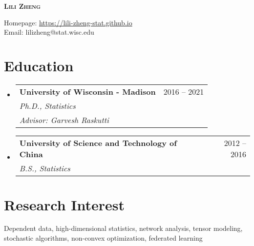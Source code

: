 \documentclass[letterpaper,11pt]{article}
\makeatletter
\newcommand{\resumeSubheadingthreelines}[6]{
	\vspace{-2pt}\item
	\begin{tabular*}{0.97\textwidth}[t]{l@{\extracolsep{\fill}}r}
		\textbf{#1} & #2 \\
		\textit{\small#3} & \textit{\small #4} \\
		\textit{\small#5} & \textit{\small #6} 
	\end{tabular*}\vspace{-7pt}
}
\newcommand{\resumeSubheading}[4]{
	\vspace{-2pt}\item
	\begin{tabular*}{0.97\textwidth}[t]{l@{\extracolsep{\fill}}r}
		\textbf{#1} & #2 \\
		\textit{\small#3} & \textit{\small #4}
	\end{tabular*}\vspace{-7pt}
}
\newcommand{\resumeSubHeadingListStart}{\begin{itemize}[leftmargin=0.15in, label={}]}
\newcommand{\resumeSubHeadingListEnd}{\end{itemize}}
\makeatother
\begin{document}
	
	
	\begin{center}
		\textbf{\Huge \scshape Lili Zheng} \\ \vspace{1pt}
		\begin{center}{\small Homepage: \href{https://Lili-Zheng-stat.github.io}{https://lili-zheng-stat.github.io}\\Email: lilizheng@stat.wisc.edu}
	\end{center}
	\end{center}
	
	
	\section{Education}
	\resumeSubHeadingListStart
	\resumeSubheadingthreelines
	{University of Wisconsin - Madison}{2016 -- 2021}
	{{\sl Ph.D.}, Statistics}{}
	{Advisor: Garvesh Raskutti}{}
	\resumeSubheading
	{University of Science and Technology of China}{2012 -- 2016}
	{{\sl B.S.}, Statistics}{}
	\resumeSubHeadingListEnd
	
	
	\section{Research Interest}
	Dependent data, high-dimensional statistics, network analysis, tensor modeling, stochastic algorithms, non-convex optimization, federated learning
	
\end{document}
